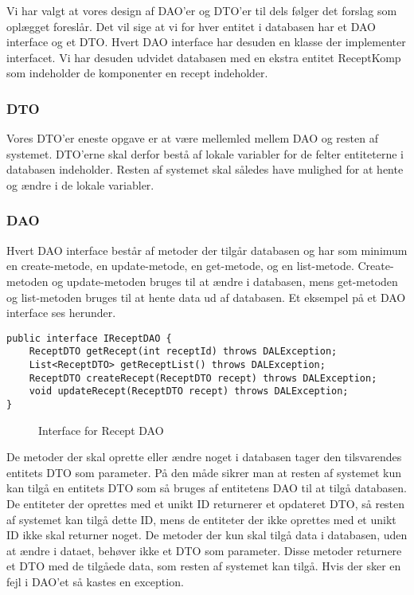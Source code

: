 \documentclass[a4paper]{article}
\begin{document}
Vi har valgt at vores design af DAO’er og DTO’er til dels følger det forslag som oplægget foreslår. Det vil sige at vi for hver entitet i databasen har et DAO interface og et DTO. Hvert DAO interface har desuden en klasse der implementer interfacet. Vi har desuden udvidet databasen med en ekstra entitet ReceptKomp som indeholder de komponenter en recept indeholder.

\subsubsection{DTO} %

Vores DTO’er eneste opgave er at være mellemled mellem DAO og resten af systemet. DTO’erne skal derfor bestå af lokale variabler for de felter entiteterne i databasen indeholder. Resten af systemet skal således have mulighed for at hente og ændre i de lokale variabler.  


\subsubsection{DAO} %

Hvert DAO interface består af metoder der tilgår databasen og har som minimum en create-metode, en update-metode, en get-metode, og en list-metode. Create-metoden og update-metoden bruges til at ændre i databasen, mens get-metoden og list-metoden bruges til at hente data ud af databasen. Et eksempel på et DAO interface ses herunder.

\begin{lstlisting}
public interface IReceptDAO {
	ReceptDTO getRecept(int receptId) throws DALException;
	List<ReceptDTO> getReceptList() throws DALException;
	ReceptDTO createRecept(ReceptDTO recept) throws DALException;
	void updateRecept(ReceptDTO recept) throws DALException;
}
\end{lstlisting}
\begin{figure}[h!]
  \caption{Interface for Recept DAO}
\end{figure}


De metoder der skal oprette eller ændre noget i databasen tager den tilsvarendes entitets DTO som parameter. På den måde sikrer man at resten af systemet kun kan tilgå en entitets DTO som så bruges af entitetens DAO til at tilgå databasen. De entiteter der oprettes med et unikt ID returnerer et opdateret DTO, så resten af systemet kan tilgå dette ID, mens de entiteter der ikke oprettes med et unikt ID ikke skal returner noget.  De metoder der kun skal tilgå data i databasen, uden at ændre i dataet, behøver ikke et DTO som parameter. Disse metoder returnere et DTO med de tilgåede data, som resten af systemet kan tilgå. Hvis der sker en fejl i DAO’et så kastes en exception.
\end{document}
